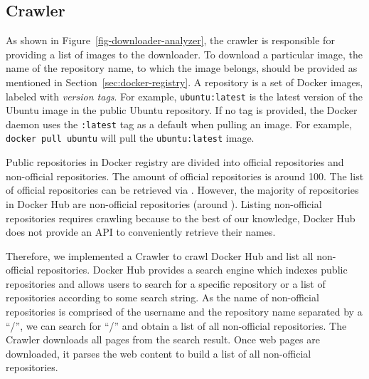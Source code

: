 %
\subsection{Crawler}
\label{sec:crawler}

As shown in Figure~\ref{fig-downloader-analyzer}, the crawler is responsible
for providing a list of images to the downloader.
%
To download a particular image, %
the name of the repository name, to which the image belongs, should be provided
as mentioned in Section~\ref{sec:docker-registry}. 
%
A repository is a set of Docker images, labeled with \emph{version tags}.
%
For example, \texttt{ubuntu:latest} is the latest version of the Ubuntu image in the
public Ubuntu repository.
%
If no tag is provided, the Docker daemon uses the \texttt{:latest} tag as a default
when pulling an image. For example, \texttt{docker pull ubuntu} will pull the
\texttt{ubuntu:latest} image.
%

Public repositories in Docker registry are divided into official repositories 
and non-official repositories.
%
%
The amount of official repositories is around 100. The list of official repositories
can be retrieved via . However, the majority
of repositories in Docker Hub are non-official repositories (around ).
Listing non-official repositories requires crawling because to the best of our knowledge,
Docker Hub does not provide an API to conveniently retrieve their names.

Therefore, we implemented a Crawler to crawl Docker Hub and list all non-official
repositories.
%
Docker Hub provides a search engine which indexes public repositories and allows
users to search for a specific repository or a list of repositories according to
some search string. 
%
As the name of non-official repositories is comprised
of the username and the repository name separated by a ``/'',
we can search for ``/'' and obtain a list of all non-official
repositories.
%
%
%
The Crawler downloads all pages from the search result.
%
Once web pages are downloaded, it parses the web content to build a list of
all non-official repositories.

